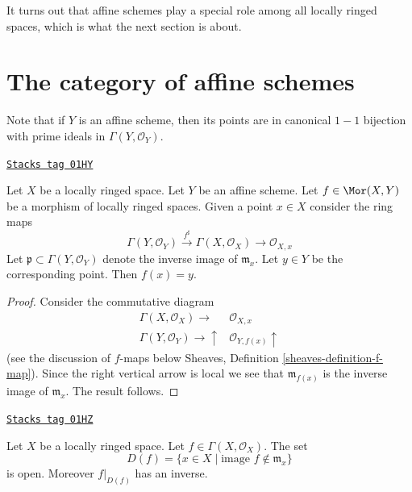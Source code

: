 It turns out that affine schemes play a special role
among all locally ringed spaces, which is what the next
section is about.

\section{The category of affine schemes}
\label{schemes-section-category-affine-schemes}
Note that if $Y$ is an affine scheme, then its
points are in canonical $1-1$ bijection with
prime ideals in $\Gamma(Y, \mathcal{O}_Y)$.

\begin{lemma}
\label{schemes-lemma-morphism-into-affine-where-point-goes}
\href{https://stacks.math.columbia.edu/tag/01HY}{\texttt{Stacks tag 01HY}}

Let $X$ be a locally ringed space.
Let $Y$ be an affine scheme.
Let $f \in \Mor(X, Y)$ be a morphism
of locally ringed spaces. Given a point $x \in X$
consider the ring maps
$$
\Gamma(Y, \mathcal{O}_Y) \xrightarrow{f^\sharp}
\Gamma(X, \mathcal{O}_X) \to \mathcal{O}_{X, x}
$$
Let $\mathfrak p \subset \Gamma(Y, \mathcal{O}_Y)$ denote
the inverse image of $\mathfrak m_x$. Let $y \in Y$ be the
corresponding point. Then $f(x) = y$.
\end{lemma}

\begin{proof}
Consider the commutative diagram
$$
\begin{array}{cc}\Gamma(X, \mathcal{O}_X) \longrightarrow & \mathcal{O}_{X, x} \\ \Gamma(Y, \mathcal{O}_Y) \longrightarrow\uparrow & \mathcal{O}_{Y, f(x)} \uparrow\end{array}
$$
(see the discussion of $f$-maps below
Sheaves, Definition \ref{sheaves-definition-f-map}).
Since the right vertical arrow is local
we see that $\mathfrak m_{f(x)}$ is the
inverse image of $\mathfrak m_x$. The result
follows.
\end{proof}

\begin{lemma}[F open]
\label{schemes-lemma-f-open}
\href{https://stacks.math.columbia.edu/tag/01HZ}{\texttt{Stacks tag 01HZ}}

Let $X$ be a locally ringed space.
Let $f \in \Gamma(X, \mathcal{O}_X)$.
The set
$$
D(f) = \{x \in X \mid \text{image }f \not\in \mathfrak m_x\}
$$
is open. Moreover $f|_{D(f)}$ has an inverse.
\end{lemma}

